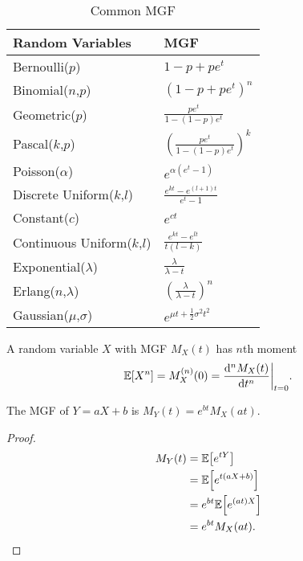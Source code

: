 \begin{table}[H]
    \centering
    \renewcommand{\arraystretch}{2}
    \begin{tabular}{|l|l|}
    \hline
    Random Variables            & MGF                                               \\ \hline
    Bernoulli($p$)              & $1-p+pe^t$                                 \\ \hline
    Binomial($n$,$p$)           & $(1-p+pe^t)^n$                             \\ \hline
    Geometric($p$)              & $\frac{pe^t}{1-(1-p)e^t}$                  \\ \hline
    Pascal($k$,$p$)             & $\left(\frac{pe^t}{1-(1-p)e^t}\right)^k$   \\ \hline
    Poisson($\alpha$)           & $e^{\alpha(e^t-1)}$                        \\ \hline
    Discrete Uniform($k$,$l$)   & $\frac{e^{kt}-e^{(l+1)t}}{e^t-1}$          \\ \hline
    Constant($c$)               & $e^{ct}$                                   \\ \hline
    Continuous Uniform($k$,$l$) & $\frac{e^{kt}-e^{lt}}{t(l-k)}$             \\ \hline
    Exponential($\lambda$)      & $\frac{\lambda}{\lambda-t}$                \\ \hline
    Erlang($n$,$\lambda$)       & $\left(\frac{\lambda}{\lambda-t}\right)^n$ \\ \hline
    Gaussian($\mu$,$\sigma$)    & $e^{\mu t+\frac{1}{2}\sigma^2t^2}$         \\ \hline
    \end{tabular}
    \caption{Common MGF}
\end{table}

\begin{theorem}
    A random variable $X$ with \textnormal{MGF} $M_X(t)$ has $n$th moment
    \[\E{X^n}=M_X^{(n)}(0)=\frac{\diff^n M_X(t)}{\diff t^n}\bigg\rvert_{t=0}.\]
\end{theorem}

\begin{theorem}
    The \textnormal{MGF} of $Y=aX+b$ is $M_Y(t)=e^{bt}M_X(at)$.
\end{theorem}

\begin{proof}
    \begin{align*}
        M_Y(t)&=\E{e^{tY}}\\
        &=\E{e^{t(aX+b)}}\\
        &=e^{bt}\E{e^{(at)X}}\\
        &=e^{bt}M_X(at).
    \end{align*}
\end{proof}

